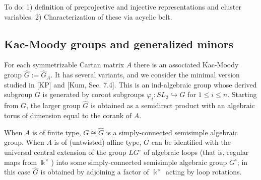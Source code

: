\documentclass[12pt]{amsart}
\newcommand{\CC}{\mathbb{C}}
\newcommand{\kk}{\Bbbk}%
\newcommand\into{\hookrightarrow}
\DeclareMathOperator{\corank}{corank}
\theoremstyle{remark}
\numberwithin{equation}{section}
\begin{document}
To do: 1) definition of preprojective and injective representations and cluster variables. 2) Characterization of these via acyclic belt.


\subsection{Kac-Moody groups and generalized minors}

For each symmetrizable Cartan matrix $A$ there is an associated Kac-Moody group $\widehat{G}:=\widehat{G}_A$. 
It has several variants, and we consider the minimal version studied in [KP] and [Kum, Sec. 7.4]. 
This is an ind-algebraic group whose derived subgroup $G$ is generated by coroot subgroups $\varphi_i: SL_2 \into G$ for $1 \leq i \leq n$. Starting from $G$, the larger group $\widehat{G}$ is obtained as a semidirect product with an algebraic torus of dimension equal to the corank of $A$.


When $A$ is of finite type, $G \cong \widehat{G}$ is a simply-connected semisimple algebraic group. When $A$ is of (untwisted) affine type, $G$ can be identified with the universal central extension of the group $LG^\circ$ of algebraic loops (that is, regular maps from $\kk^\times$) into some simply-connected semisimple algebraic group $G^\circ$; in this case $\widehat{G}$ is obtained by adjoining a factor of $\kk^\times$ acting by loop rotations.
\end{document}
